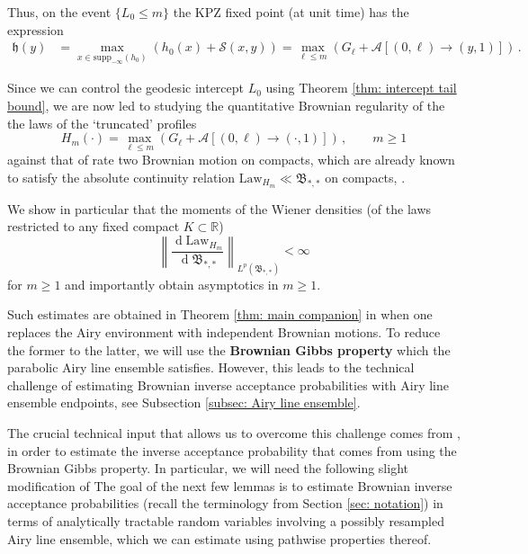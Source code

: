 \documentclass[11pt, reqno]{amsart}
\numberwithin{equation}{section}
\newcommand{\R}{\ensuremath{\mathbb{R}}}
\newcommand{\norm}[1]{\left\lVert#1\right\rVert}
\newcommand{\diff}{\ensuremath{\operatorname{d}\!}}
\begin{document}
Thus, on the event $\{L_0\leq m\}$ the KPZ fixed point (at unit time) has the expression 
\begin{equation*}
\begin{array}{ll}
    \mathfrak{h}(y) &= \displaystyle\max_{x\in \mathrm{supp}_{-\infty}(h_0)}(h_0(x)+\mathcal{S}(x,y))= \displaystyle\max_{\ell \le m}(G_\ell + \mathcal{A}[(0,\ell)\to (y,1)])\,.
\end{array}
\end{equation*}

Since we can control the geodesic intercept $L_0$ using Theorem \ref{thm: intercept tail bound}, we are now led to studying the quantitative Brownian regularity of the the laws of the `truncated' profiles
\begin{equation}\label{eq: fin depth KPZ}
H_m(\cdot) = \displaystyle\max_{\ell \le m}(G_\ell + \mathcal{A}[(0,\ell)\to (\cdot, 1)])\,,\qquad m \ge 1
\end{equation}
against that of rate two Brownian motion on compacts, which are already known to satisfy the absolute continuity relation $\mathrm{Law}_{H_m}\ll \mathfrak{B}_{*, *}$ on compacts, \cite[Proposition 5.1]{sarkar2021brownian}.

We show in particular that the moments of the Wiener densities (of the laws restricted to any fixed compact $K\subset \R$)
$$\norm{\frac{\diff\mathrm{Law}_{H_m}}{\diff\mathfrak{B}_{*, *}}}_{L^p(\mathfrak{B}_{*, *})}< \infty $$ for $m\ge 1$ and importantly obtain asymptotics in $m\ge 1$. 

Such estimates are obtained in Theorem \ref{thm: main companion} in \cite{tassopoulos2025inhomogeneousbrownian} when one replaces the Airy environment with independent Brownian motions. To reduce the former to the latter, we will use the \textbf{Brownian Gibbs property} which the parabolic Airy line ensemble satisfies. However, this leads to the technical challenge of estimating Brownian inverse acceptance probabilities with Airy line ensemble endpoints, see Subsection \ref{subsec: Airy line ensemble}.

The crucial technical input that allows us to overcome this challenge comes from \cite{dauvergne2024wienerdensitiesairyline}, in order to estimate the inverse acceptance probability that comes from using the Brownian Gibbs property. In particular, we will need the following slight modification of \cite[Lemmas 3.2, 3.3]{dauvergne2024wienerdensitiesairyline} 
The goal of the next few lemmas is to estimate Brownian inverse acceptance probabilities (recall the terminology from Section \ref{sec: notation}) in terms of analytically tractable random variables involving a possibly resampled Airy line ensemble, which we can estimate using pathwise properties thereof.
\end{document}
